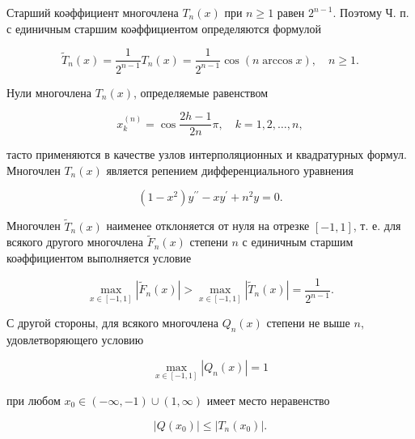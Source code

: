 \documentclass[10pt]{article}
\begin{document}
Старший коәффициент многочлена $T_{n}(x)$ при $n \geqslant 1$ равен $2^{n-1}$. Поэтому Ч. п. с единичным старшим коәффициентом определяются формулой



\[

\tilde{T}_{n}(x)=\frac{1}{2^{n-1}} T_{n}(x)=\frac{1}{2^{n-1}} \cos (n \arccos x), \quad n \geqslant 1 .

\]



Нули многочлена $T_{n}(x)$, определяемые равенством



\[

x_{k}^{(n)}=\cos \frac{2 h-1}{2 n} \pi, \quad k=1,2, \ldots, n,

\]



тасто применяются в качестве узлов интерполяционных и квадратурных формул. Многочлен $T_{n}(x)$ является репением дифференциального уравнения



\[

\left(1-x^{2}\right) y^{\prime \prime}-x y^{\prime}+n^{2} y=0 .

\]



Многочлен $\tilde{T}_{n}(x)$ наименее отклоняется от нуля на отрезке $[-1,1]$, т. е. для всякого другого многочлена $\tilde{F}_{n}(x)$ степени $n$ с единичным старшим коәффициентом выполняется условие



\[

\max _{x \in[-1,1]}\left|\tilde{F}_{n}(x)\right|>\max _{x \in[-1,1]}\left|\tilde{T}_{n}(x)\right|=\frac{1}{2^{n-1}} .

\]



С другой стороны, для всякого многочлена $Q_{n}(x)$ степени не выше $n$, удовлетворяющего условию



\[

\max _{x \in[-1,1]}\left|Q_{n}(x)\right|=1

\]



при любом $x_{0} \in(-\infty,-1) \cup(1, \infty)$ имеет место неравенство



\[

\left|Q\left(x_{0}\right)\right| \leqslant\left|T_{n}\left(x_{0}\right)\right| .

\]
\end{document}
